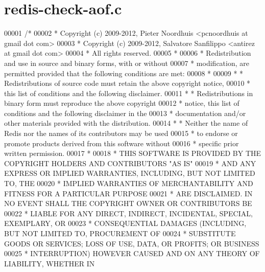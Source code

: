 \hypertarget{redis-check-aof_8c_source}{}\section{redis-\/check-\/aof.c}
\label{redis-check-aof_8c_source}

\begin{DoxyCode}
00001 \textcolor{comment}{/*}
00002 \textcolor{comment}{ * Copyright (c) 2009-2012, Pieter Noordhuis <pcnoordhuis at gmail dot com>}
00003 \textcolor{comment}{ * Copyright (c) 2009-2012, Salvatore Sanfilippo <antirez at gmail dot com>}
00004 \textcolor{comment}{ * All rights reserved.}
00005 \textcolor{comment}{ *}
00006 \textcolor{comment}{ * Redistribution and use in source and binary forms, with or without}
00007 \textcolor{comment}{ * modification, are permitted provided that the following conditions are met:}
00008 \textcolor{comment}{ *}
00009 \textcolor{comment}{ *   * Redistributions of source code must retain the above copyright notice,}
00010 \textcolor{comment}{ *     this list of conditions and the following disclaimer.}
00011 \textcolor{comment}{ *   * Redistributions in binary form must reproduce the above copyright}
00012 \textcolor{comment}{ *     notice, this list of conditions and the following disclaimer in the}
00013 \textcolor{comment}{ *     documentation and/or other materials provided with the distribution.}
00014 \textcolor{comment}{ *   * Neither the name of Redis nor the names of its contributors may be used}
00015 \textcolor{comment}{ *     to endorse or promote products derived from this software without}
00016 \textcolor{comment}{ *     specific prior written permission.}
00017 \textcolor{comment}{ *}
00018 \textcolor{comment}{ * THIS SOFTWARE IS PROVIDED BY THE COPYRIGHT HOLDERS AND CONTRIBUTORS "AS IS"}
00019 \textcolor{comment}{ * AND ANY EXPRESS OR IMPLIED WARRANTIES, INCLUDING, BUT NOT LIMITED TO, THE}
00020 \textcolor{comment}{ * IMPLIED WARRANTIES OF MERCHANTABILITY AND FITNESS FOR A PARTICULAR PURPOSE}
00021 \textcolor{comment}{ * ARE DISCLAIMED. IN NO EVENT SHALL THE COPYRIGHT OWNER OR CONTRIBUTORS BE}
00022 \textcolor{comment}{ * LIABLE FOR ANY DIRECT, INDIRECT, INCIDENTAL, SPECIAL, EXEMPLARY, OR}
00023 \textcolor{comment}{ * CONSEQUENTIAL DAMAGES (INCLUDING, BUT NOT LIMITED TO, PROCUREMENT OF}
00024 \textcolor{comment}{ * SUBSTITUTE GOODS OR SERVICES; LOSS OF USE, DATA, OR PROFITS; OR BUSINESS}
00025 \textcolor{comment}{ * INTERRUPTION) HOWEVER CAUSED AND ON ANY THEORY OF LIABILITY, WHETHER IN}

\end{DoxyCode}
